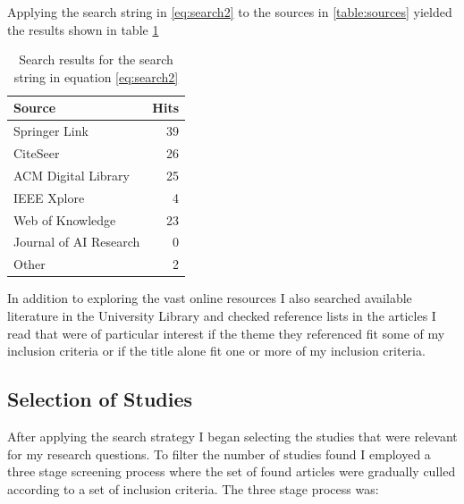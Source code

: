 \documentclass[a4paper]{book}
\begin{document}
				Applying the search string in \ref{eq:search2} to the sources in \ref{table:sources} yielded the results shown in table \ref{table:SearchResults}
				\begin{table}[htdp]
				\begin{center}
				\begin{tabular}{|l|r|}
				\hline
				Source				& Hits 	\\ \hline
				Springer Link 			& 39 	\\ \hline
				CiteSeer    			& 26 \\ \hline
				ACM Digital Library 		& 25 \\ \hline
				IEEE Xplore 			& 4  \\ \hline
				Web of Knowledge 		& 23 \\ \hline
				Journal of AI Research 		& 0 	\\ \hline
				Other  				& 2 \\\hline\hline
				\end{tabular}
				\end{center}
				\label{table:SearchResults}
				\caption{Search results for the search string in equation \ref{eq:search2}}
				\end{table}
				In addition to exploring the vast online resources I also searched available literature in the University Library and checked reference lists in the articles I read that were of particular interest if the theme they referenced fit some of my inclusion criteria or if the title alone fit one or more of my inclusion criteria.



				\subsection{Selection of Studies}

				After applying the search strategy I began selecting the studies that were relevant for my research questions. To filter the number of studies found I employed a three stage screening process where the set of found articles were gradually culled according to a set of inclusion criteria. The three stage process was:
\end{document}
